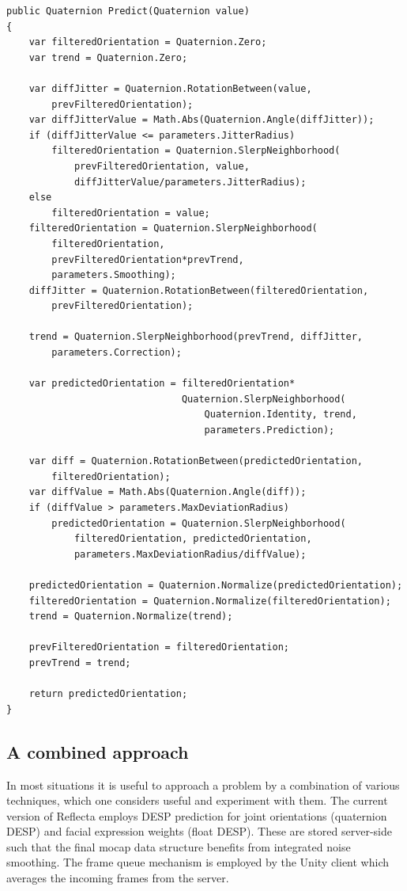 \documentclass[a4paper, 12pt]{amsart}
\begin{document}
\begin{lstlisting}[basicstyle=\tiny]
public Quaternion Predict(Quaternion value)
{
    var filteredOrientation = Quaternion.Zero;
    var trend = Quaternion.Zero;

    var diffJitter = Quaternion.RotationBetween(value, 
        prevFilteredOrientation);
    var diffJitterValue = Math.Abs(Quaternion.Angle(diffJitter));
    if (diffJitterValue <= parameters.JitterRadius)
        filteredOrientation = Quaternion.SlerpNeighborhood(
            prevFilteredOrientation, value,
            diffJitterValue/parameters.JitterRadius);
    else
        filteredOrientation = value;
    filteredOrientation = Quaternion.SlerpNeighborhood(
        filteredOrientation,
        prevFilteredOrientation*prevTrend,
        parameters.Smoothing);
    diffJitter = Quaternion.RotationBetween(filteredOrientation, 
        prevFilteredOrientation);

    trend = Quaternion.SlerpNeighborhood(prevTrend, diffJitter,
        parameters.Correction);

    var predictedOrientation = filteredOrientation*
                               Quaternion.SlerpNeighborhood(
                                   Quaternion.Identity, trend,
                                   parameters.Prediction);

    var diff = Quaternion.RotationBetween(predictedOrientation, 
        filteredOrientation);
    var diffValue = Math.Abs(Quaternion.Angle(diff));
    if (diffValue > parameters.MaxDeviationRadius)
        predictedOrientation = Quaternion.SlerpNeighborhood(
            filteredOrientation, predictedOrientation,
            parameters.MaxDeviationRadius/diffValue);

    predictedOrientation = Quaternion.Normalize(predictedOrientation);
    filteredOrientation = Quaternion.Normalize(filteredOrientation);
    trend = Quaternion.Normalize(trend);

    prevFilteredOrientation = filteredOrientation;
    prevTrend = trend;

    return predictedOrientation;
}
\end{lstlisting}

\subsection{A combined approach}

In most situations it is useful to approach a problem by a combination of various techniques, which one considers useful and experiment with them. The current version of Reflecta employs DESP prediction for joint orientations (quaternion DESP) and facial expression weights (float DESP). These are stored server-side such that the final mocap data structure benefits from integrated noise smoothing. The frame queue mechanism is employed by the Unity client which averages the incoming frames from the server.
\end{document}
